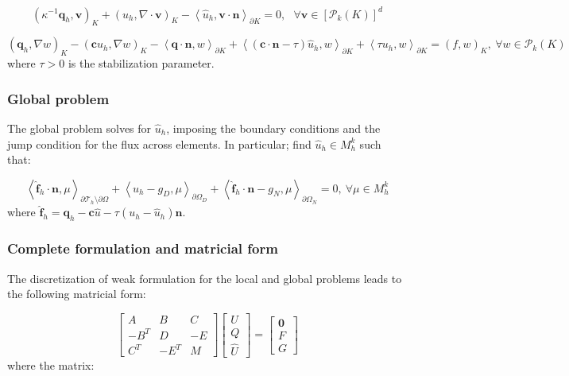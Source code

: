 \documentclass[10pt,a4paper]{article}
\begin{document}
\begin{equation}
    (\kappa^{-1}\mathbf{q}_h,\mathbf{v})_K + (u_h,\nabla \cdot \mathbf{v})_K - \left<\hat{u}_h,\mathbf{v}\cdot \mathbf{n}\right>_{\partial K} = 0,~~~\forall \mathbf{v} \in [\mathcal{P}_k(K)]^d
	\label{e:local1}
\end{equation}

\begin{equation}
    (\mathbf{q}_h,\nabla w)_K - (\mathbf{c}u_h,\nabla w)_K
    - \left<\mathbf{q} \cdot \mathbf{n},w\right>_{\partial K}
    + \left<(\mathbf{c}\cdot\mathbf{n} - \tau)\hat{u}_h,w\right>_{\partial K}
    + \left<\tau u_h,w\right>_{\partial K} = (f,w)_K,~ \forall w \in \mathcal{P}_k(K)
\end{equation}
where $\tau > 0$ is the stabilization parameter.

\subsubsection*{Global problem}

The global problem solves for $\hat{u}_h$, imposing the boundary
conditions and the jump condition for the flux across elements. In particular; find $\hat{u}_h \in M_h^k$ such that:

\begin{equation}
	\left<\hat{\mathbf{f}}_h \cdot \mathbf{n}, \mu\right>_{\partial \mathcal{T}_h \setminus \partial \Omega}
	+ \left<\hat{u}_h - g_D, \mu\right>_{\partial \Omega_D} 
	+ \left<\hat{\mathbf{f}}_h \cdot \mathbf{n} - g_N, \mu \right>_{\partial \Omega_N} = 0,~\forall \mu \in M_h^k
	\label{e:global}
\end{equation}
where $\hat{\mathbf{f}}_h = \mathbf{q}_h - \mathbf{c}\hat{u} - \tau(u_h - \hat{u}_h)\mathbf{n}$.
\subsubsection*{Complete formulation and matricial form}

The discretization of weak formulation for the local and global problems leads to the following matricial form:

\begin{equation}
	\begin{bmatrix}
		A & B & C \\
		-B^T & D & -E \\
		C^T & - E^T & M
	\end{bmatrix}
	\begin{bmatrix}
		U \\
		Q \\
		\hat{U}
	\end{bmatrix}
	=
	\begin{bmatrix}
		\mathbf{0} \\
		F\\
		G
	\end{bmatrix}
\end{equation}
where the matrix:
\end{document}
